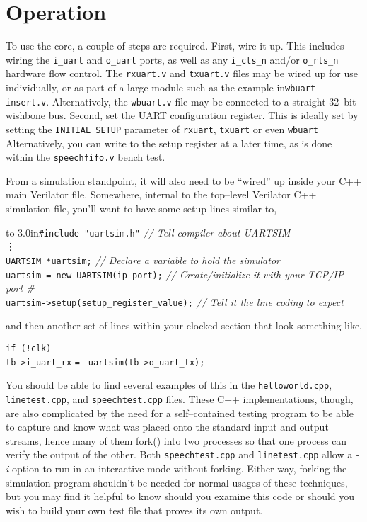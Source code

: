 \documentclass{gqtekspec}
\begin{document}
\chapter{Operation}\label{ch:ops}

%

To use the core, a couple of steps are required.  First, wire it up.  This
includes wiring the {\tt i\_uart} and {\tt o\_uart} ports, as well as any
{\tt i\_cts\_n} and/or {\tt o\_rts\_n} hardware flow control.  The
{\tt rxuart.v} and {\tt txuart.v} files may be wired up for use individually,
or as part of a large module such as the example in{\tt wbuart-insert.v}. 
Alternatively, the {\tt wbuart.v} file may be connected to a straight 32--bit
wishbone bus.
Second, set the UART configuration register.  This is ideally set by setting
the {\tt INITIAL\_SETUP} parameter of {\tt rxuart}, {\tt txuart} or even
{\tt wbuart}  Alternatively, you can write to the setup register at a later
time, as is done within the {\tt speechfifo.v} bench test.

From a simulation standpoint, it will also need to be ``wired'' up inside your
C++ main Verilator file.  Somewhere, internal to the top--level Verilator
C++ simulation file, you'll want to have some setup lines similar to,
\begin{tabbing}
\hbox to 3.0in{\tt \#include "uartsim.h"} \= {\em // Tell compiler about UARTSIM}\\
\vdots \\
{\tt UARTSIM *uartsim;} \> {\em // Declare a variable to hold the simulator}\\
{\tt uartsim = new UARTSIM(ip\_port);} \> {\em // Create/initialize it with your TCP/IP port \#} \\
{\tt uartsim->setup(setup\_register\_value);} \> {\em // Tell it the line coding to expect}\\
\end{tabbing}
and then another set of lines within your clocked section that look something
like,
\begin{tabbing}
{\tt if (!clk)} \= \\
\> {\tt tb->i\_uart\_rx} {\tt = } {\tt uartsim(tb->o\_uart\_tx);}
\end{tabbing}
You should be able to find several examples of this in the {\tt helloworld.cpp},
{\tt linetest.cpp}, and {\tt speechtest.cpp} files.  These C++ implementations,
though, are also complicated by the need for a self--contained testing program
to be able to capture and know what was placed onto the standard input and
output streams, hence many of them fork() into two processes so that one
process can verify the output of the other.  Both {\tt speechtest.cpp} and
{\tt linetest.cpp} allow a {\em -i} option to run in an interactive mode without
forking.  Either way, forking the simulation program shouldn't be needed for
normal usages of these techniques, but you may find it helpful to know should
you examine this code or should you wish to build your own test file that
proves its own output.
\end{document}
